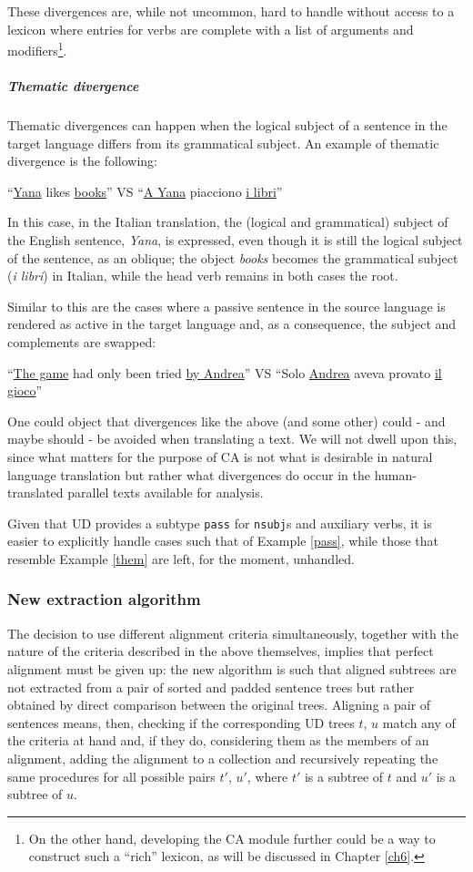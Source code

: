 These divergences are, while not uncommon, hard to handle without access to a lexicon where entries for verbs are complete with a list of arguments and modifiers\footnote{On the other hand, developing the CA module further could be a way to construct such a ``rich'' lexicon, as will be discussed in Chapter \ref{ch6}.}.

\subparagraph*{Thematic divergence}
Thematic divergences can happen when the logical subject of a sentence in the target language differs from its grammatical subject. An example of thematic divergence is the following:
\begin{example} \label{them}
 ``\underline{Yana} likes \underline{books}'' VS ``\underline{A Yana} piacciono \underline{i libri}''
\end{example}
In this case, in the Italian translation, the (logical and grammatical) subject of the English sentence, \textit{Yana}, is expressed, even though it is still the logical subject of the sentence, as an oblique; the object \textit{books} becomes the grammatical subject (\textit{i libri}) in Italian, while the head verb remains in both cases the root. \smallskip

Similar to this are the cases where a passive sentence in the source language is rendered as active in the target language and, as a consequence, the subject and complements are swapped:
\begin{example} \label{pass}
 ``\underline{The game} had only been tried \underline{by Andrea}'' VS ``Solo \underline{Andrea} aveva provato \underline{il gioco}''
\end{example} \smallskip

One could object that divergences like the above (and some other) could - and maybe should - be avoided when translating a text. We will not dwell upon this, since what matters for the purpose of CA is not what is desirable in natural language translation but rather what divergences do occur in the human-translated parallel texts available for analysis. \smallskip

Given that UD provides a subtype \texttt{pass} for \texttt{nsubj}s and auxiliary verbs, it is easier to explicitly handle cases such that of Example \ref{pass}, while those that resemble Example \ref{them} are left, for the moment, unhandled.

\subsubsection{New extraction algorithm} \label{extralg}
The decision to use different alignment criteria simultaneously, together with the nature of the criteria described in the above themselves, implies that perfect alignment must be given up: the new algorithm is such that aligned subtrees are not extracted from a pair of sorted and padded sentence trees but rather obtained by direct comparison between the original trees. Aligning a pair of sentences means, then, checking if the corresponding UD trees $t$, $u$ match any of the criteria at hand and, if they do, considering them as the members of an alignment, adding the alignment to a collection and recursively repeating the same procedures for all possible pairs $t'$, $u'$, where $t'$ is a subtree of $t$ and $u'$ is a subtree of $u$.

